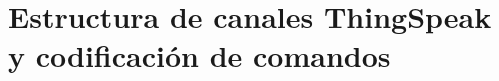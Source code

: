 \chapter{Estructura de canales ThingSpeak y codificación de comandos}
\label{anexo:thingspeak_comandos}